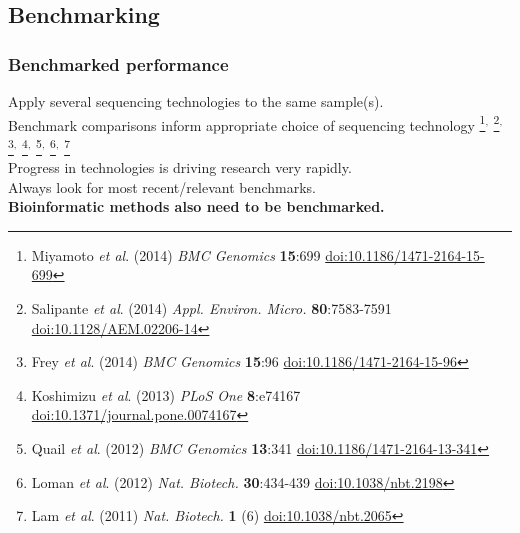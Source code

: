 \subsection{Benchmarking}

\begin{frame}
  \frametitle{Benchmarked performance}
  Apply several sequencing technologies to the same sample(s). \\  
  Benchmark comparisons inform appropriate choice of sequencing technology%
\footnote{\tiny{Miyamoto \textit{et al}. (2014) \textit{BMC Genomics} \textbf{15}:699 \href{http://dx.doi.org/10.1186/1471-2164-15-699}{doi:10.1186/1471-2164-15-699}}}$^{,}$%
\footnote{\tiny{Salipante \textit{et al}. (2014) \textit{Appl. Environ. Micro.} \textbf{80}:7583-7591 \href{http://dx.doi.org/10.1128/AEM.02206-14}{doi:10.1128/AEM.02206-14}}}$^{,}$%
\footnote{\tiny{Frey \textit{et al}. (2014) \textit{BMC Genomics} \textbf{15}:96 \href{http://dx.doi.org/10.1186/1471-2164-15-96}{doi:10.1186/1471-2164-15-96}}}$^{,}$%
\footnote{\tiny{Koshimizu \textit{et al}. (2013) \textit{PLoS One} \textbf{8}:e74167 \href{http://dx.doi.org/10.1371/journal.pone.0074167}{doi:10.1371/journal.pone.0074167}}}$^{,}$%
\footnote{\tiny{Quail \textit{et al}. (2012) \textit{BMC Genomics} \textbf{13}:341 \href{http://dx.doi.org/10.1186/1471-2164-13-341}{doi:10.1186/1471-2164-13-341}}}$^{,}$%
\footnote{\tiny{Loman \textit{et al}. (2012) \textit{Nat. Biotech.} \textbf{30}:434-439 \href{http://dx.doi.org/10.1038/nbt.2198}{doi:10.1038/nbt.2198}}}$^{,}$%
\footnote{\tiny{Lam \textit{et al}. (2011) \textit{Nat. Biotech.} \textbf{1} (6) \href{http://dx.doi.org/10.1038/nbt.2065}{doi:10.1038/nbt.2065}}} \\[0.5cm]
  Progress in technologies is driving research very rapidly. \\
  Always look for most recent/relevant benchmarks. \\[0.5cm]
  \textbf{Bioinformatic methods also need to be benchmarked.}
\end{frame}

